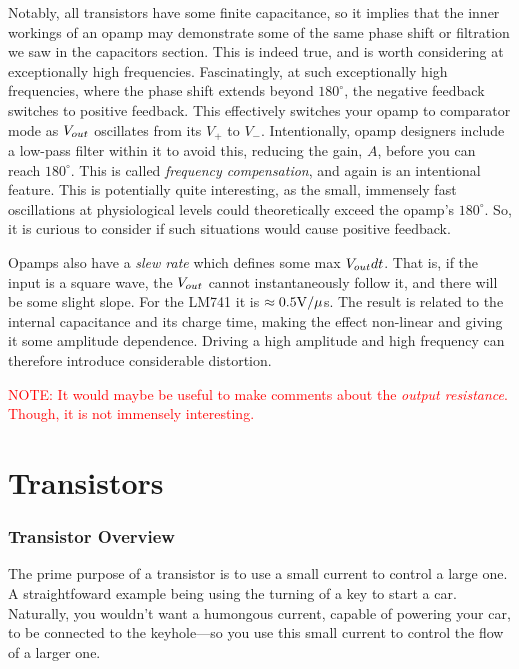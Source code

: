 Notably, all transistors have some finite capacitance, so it implies that the inner workings of an opamp may demonstrate some of the same phase shift or filtration we saw in the capacitors section. This is indeed true, and is worth considering at exceptionally high frequencies. Fascinatingly, at such exceptionally high frequencies, where the phase shift extends beyond $180^{\circ}$, the negative feedback switches to positive feedback. This effectively switches your opamp to comparator mode as ${V}_{out}$ oscillates from its $V_+$ to $V_-$. Intentionally, opamp designers include a low-pass filter within it to avoid this, reducing the gain, $A$, before you can reach $180^{\circ}$. This is called \textit{frequency compensation}, and again is an intentional feature. This is potentially quite interesting, as the small, immensely fast oscillations at physiological levels could theoretically exceed the opamp's $180^{\circ}$. So, it is curious to consider if such situations would cause positive feedback.\newline

Opamps also have a \textit{slew rate} which defines some max ${V}_{out} dt$. That is, if the input is a square wave, the ${V}_{out}$ cannot instantaneously follow it, and there will be some slight slope. For the LM741 it is $\approx 0.5{\rm V} / \mu$s. The result is related to the internal capacitance and its charge time, making the effect non-linear and giving it some amplitude dependence. Driving a high amplitude and high frequency can therefore introduce considerable distortion.\newline 

\textcolor{red}{NOTE: It would maybe be useful to make comments about the \textit{output resistance}. Though, it is not immensely interesting.}




\chapter{Transistors}

\subsection{Transistor Overview}

The prime purpose of a transistor is to use a small current to control a large one. A straightfoward example being using the turning of a key to start a car. Naturally, you wouldn't want a humongous current, capable of powering your car, to be connected to the keyhole---so you use this small current to control the flow of a larger one.\newline

